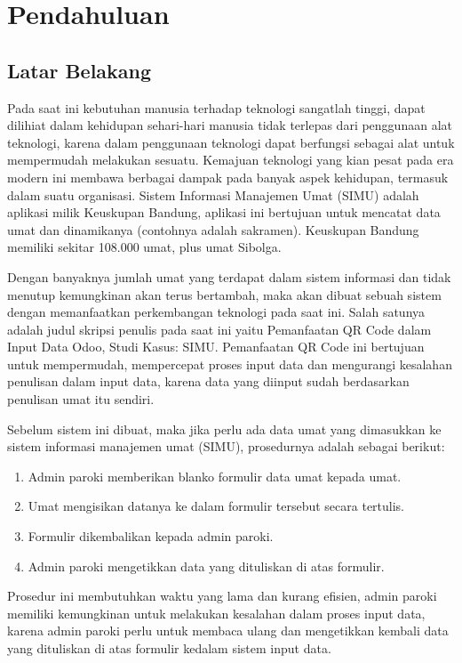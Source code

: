 \chapter{Pendahuluan}
\label{chap:intro}
   
\section{Latar Belakang}
\label{sec:label}

Pada saat ini kebutuhan manusia terhadap teknologi sangatlah tinggi, dapat dilihiat dalam kehidupan sehari-hari manusia tidak terlepas dari penggunaan alat teknologi, karena dalam penggunaan teknologi dapat berfungsi sebagai alat untuk mempermudah melakukan sesuatu. Kemajuan teknologi yang kian pesat pada era modern ini membawa berbagai dampak pada banyak aspek kehidupan, termasuk dalam suatu organisasi. Sistem Informasi Manajemen Umat (SIMU) adalah aplikasi milik Keuskupan Bandung, aplikasi ini bertujuan untuk mencatat data umat dan dinamikanya (contohnya adalah sakramen). Keuskupan Bandung memiliki sekitar 108.000 umat, plus umat Sibolga.

Dengan banyaknya jumlah umat yang terdapat dalam sistem informasi dan tidak menutup kemungkinan akan terus bertambah, maka akan dibuat sebuah sistem dengan memanfaatkan perkembangan teknologi pada saat ini. Salah satunya adalah judul skripsi penulis pada saat ini yaitu Pemanfaatan QR Code dalam Input Data Odoo, Studi Kasus: SIMU. Pemanfaatan QR Code ini bertujuan untuk mempermudah, mempercepat proses input data dan mengurangi kesalahan penulisan dalam input data, karena data yang diinput sudah berdasarkan penulisan umat itu sendiri.

Sebelum sistem ini dibuat, maka jika perlu ada data umat yang dimasukkan ke sistem informasi manajemen umat (SIMU), prosedurnya adalah sebagai berikut:
\begin{enumerate}
	\item Admin paroki memberikan blanko formulir data umat kepada umat.
	\item Umat mengisikan datanya ke dalam formulir tersebut secara tertulis.
	\item Formulir dikembalikan kepada admin paroki. 
	\item Admin paroki mengetikkan data yang dituliskan di atas formulir.
\end{enumerate}
Prosedur ini membutuhkan waktu yang lama dan kurang efisien, admin paroki memiliki kemungkinan untuk melakukan kesalahan dalam proses input data, karena admin paroki perlu untuk membaca ulang dan mengetikkan kembali data yang dituliskan di atas formulir kedalam sistem input data.

